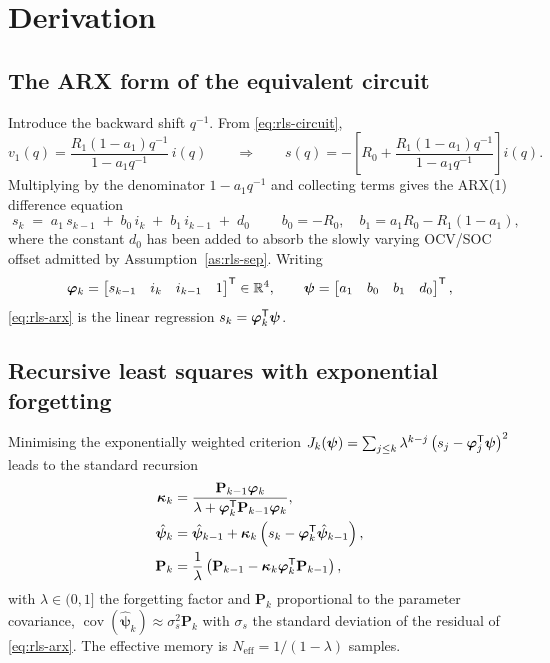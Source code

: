 \section{Derivation}

\subsection{The ARX form of the equivalent circuit}
Introduce the backward shift $q^{-1}$.  From \eqref{eq:rls-circuit},
\begin{equation}
v_1(q)=\frac{R_1(1-a_1)q^{-1}}{1-a_1q^{-1}}\,i(q)
\qquad\Longrightarrow\qquad
s(q)=-\left[R_0+\frac{R_1(1-a_1)q^{-1}}{1-a_1q^{-1}}\right]i(q).
\label{eq:rls-tf}
\end{equation}
Multiplying by the denominator $1-a_1q^{-1}$ and collecting terms gives the ARX(1) difference
equation
\begin{equation}
\boxed{\;s_k \;=\; a_1\,s_{k-1}\;+\;b_0\,i_k\;+\;b_1\,i_{k-1}\;+\;d_0\;}
\qquad
b_0=-R_0,\quad b_1=a_1R_0-R_1(1-a_1),
\label{eq:rls-arx}
\end{equation}
where the constant $d_0$ has been added to absorb the slowly varying OCV/SOC offset admitted by
Assumption~\ref{as:rls-sep}.  Writing
\begin{equation}
\bm{\varphi}_k=\begin{bmatrix}s_{k-1}& i_k& i_{k-1}& 1\end{bmatrix}^{\mathsf{T}}\in\mathbb{R}^{4},
\qquad
\bm{\psi}=\begin{bmatrix}a_1& b_0& b_1& d_0\end{bmatrix}^{\mathsf{T}},
\label{eq:rls-phi}
\end{equation}
\eqref{eq:rls-arx} is the linear regression $s_k=\bm{\varphi}_k^{\mathsf{T}}\bm{\psi}$.

\subsection{Recursive least squares with exponential forgetting}
Minimising the exponentially weighted criterion
$J_k(\bm{\psi})=\sum_{j\le k}\lambda^{k-j}\left(s_j-\bm{\varphi}_j^{\mathsf{T}}\bm{\psi}\right)^2$
leads to the standard recursion~\cite[Alg.~11.1]{ljung1999}
\begin{align}
\bm{\kappa}_k&=\frac{\mathbf{P}_{k-1}\bm{\varphi}_k}{\lambda+\bm{\varphi}_k^{\mathsf{T}}\mathbf{P}_{k-1}\bm{\varphi}_k},
\label{eq:rls-K}\\
\hat{\bm{\psi}}_k&=\hat{\bm{\psi}}_{k-1}+\bm{\kappa}_k\left(s_k-\bm{\varphi}_k^{\mathsf{T}}\hat{\bm{\psi}}_{k-1}\right),
\label{eq:rls-psi}\\
\mathbf{P}_k&=\frac{1}{\lambda}\left(\mathbf{P}_{k-1}-\bm{\kappa}_k\bm{\varphi}_k^{\mathsf{T}}\mathbf{P}_{k-1}\right),
\label{eq:rls-P}
\end{align}
with $\lambda\in(0,1]$ the forgetting factor and $\mathbf{P}_k$ proportional to the parameter
covariance, $\operatorname{cov}(\hat{\bm{\psi}}_k)\approx\sigma_s^2\mathbf{P}_k$ with $\sigma_s$ the
standard deviation of the residual of \eqref{eq:rls-arx}.  The effective memory is
$N_\text{eff}=1/(1-\lambda)$ samples.


